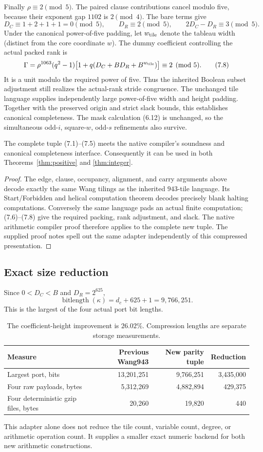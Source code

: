Finally \(\rho\equiv2\pmod5\).
The paired clause contributions cancel modulo five, because their
exponent gap \(1102\) is \(2\pmod4\). The bare terms give
\[
D_C\equiv1+2+1+1=0\pmod5,\qquad
D_R\equiv2\pmod5,\qquad
2D_C-D_R\equiv3\pmod5.
\tag{7.7}
\]
Under the canonical power-of-five padding, let \(w_{\rm tile}\)
denote the tableau width (distinct from the core coordinate \(w\)).
The dummy coefficient controlling the actual packed rank is
\[
\Gamma=\rho^{1063}(q^2-1)
\bigl[1+q(D_C+BD_R+B^{w_{\rm tile}})\bigr]\equiv2\pmod5.
\tag{7.8}
\]
It is a unit modulo the required power of five.
Thus the inherited Boolean subset adjustment still realizes the
actual-rank stride congruence.
The unchanged tile language supplies independently large
power-of-five width and height padding. Together with the
preserved origin and strict slack bounds, this establishes
canonical completeness. The mask calculation (6.12) is unchanged,
so the simultaneous odd-\(i\), square-\(w\), odd-\(s\) refinements
also survive.

\begin{proposition}
The complete tuple (7.1)--(7.5) meets the native compiler's
soundness and canonical completeness interface. Consequently
it can be used in both Theorems~\ref{thm:positive} and
\ref{thm:integer}.
\end{proposition}
\begin{proof}
The edge, clause, occupancy, alignment, and carry arguments above
decode exactly the same Wang tilings as the inherited \(943\)-tile
language. Its Start/Forbidden and helical computation theorem
\cite{wang} decodes precisely blank halting computations.
Conversely the same language pads an actual finite computation;
(7.6)--(7.8) give the required packing, rank adjustment, and slack.
The native arithmetic compiler proof \cite{blank,ordinary}
therefore applies to the complete new tuple.
The supplied proof notes spell out the same adapter independently
of this compressed presentation.
\end{proof}

\subsection{Exact size reduction}

Since \(0<D_C<B\) and \(D_R=2^{625}\),
\[
\operatorname{bitlength}(\kappa)=d_c+625+1=9{,}766{,}251.
\]
This is the largest of the four actual port bit lengths.

\begin{table}[ht]
\centering\small
\begin{tabular}{lrrr}
\toprule
Measure & Previous Wang943 & New parity tuple & Reduction\\
\midrule
Largest port, bits & 13,201,251 & 9,766,251 & 3,435,000\\
Four raw payloads, bytes & 5,312,269 & 4,882,894 & 429,375\\
Four deterministic gzip files, bytes & 20,260 & 19,820 & 440\\
\bottomrule
\end{tabular}
\caption{The coefficient-height improvement is \(26.02\%\).
Compression lengths are separate storage measurements.}
\end{table}

This adapter alone does not reduce the tile count, variable count,
degree, or arithmetic operation count. It supplies a smaller exact
numeric backend for both new arithmetic constructions.
